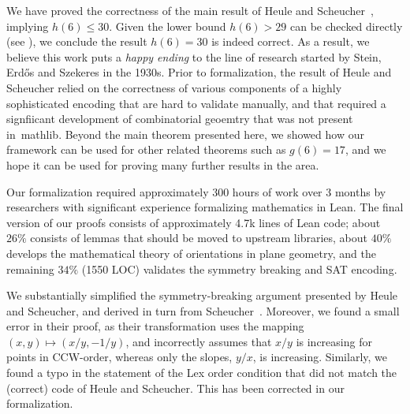 We have proved the correctness of the main result of Heule and Scheucher~\cite{emptyHexagonNumber}, implying $h(6) \leq 30$. Given the lower bound $h(6) > 29$ can be checked directly (see \cite{emptyHexagonNumber}), we conclude the result $h(6) = 30$ is indeed correct.
As a result, we believe this work puts a \emph{happy ending} to the line of research started by Stein, Erd\H{o}s and Szekeres in the 1930s. Prior to formalization, the result of Heule and Scheucher relied on the correctness of various components of a highly sophisticated encoding that are hard to validate manually, and that required a signfiicant development of combinatorial geoemtry that was not present in~\textsf{mathlib}.
Beyond the main theorem presented here,
we showed how our framework can be used for other related theorems such as $g(6) = 17$, and we hope it can be used for proving many further results in the area.


Our formalization required approximately 300 hours of work over 3 months
by researchers with significant experience formalizing mathematics in Lean.
The final version of our proofs consists of approximately 4.7k lines of Lean code;
about $26\%$ consists of lemmas that should be moved to upstream libraries,
about $40\%$ develops the mathematical theory of orientations in plane geometry,
and the remaining $34\%$ (1550 LOC) validates the symmetry breaking and SAT encoding.

We substantially simplified the symmetry-breaking argument presented by Heule and Scheucher, and derived in turn from Scheucher~\cite{scheucherTwoDisjoint5holes2020}.
Moreover, we found a small error in their proof, as their transformation uses the mapping $(x, y) \mapsto (x/y, -1/y)$, and incorrectly assumes that $x/y$ is increasing for points in CCW-order, whereas only the slopes, $y/x$, is increasing.
Similarly, we found a typo in the statement of the \textsf{Lex order} condition that did not match the (correct) code of Heule and Scheucher. This has been corrected in our formalization.



